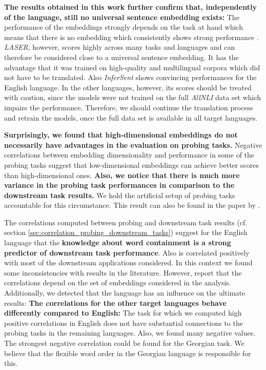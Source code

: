 \textbf{The results obtained in this work further confirm that, independently of the language, still no universal sentence embedding exists:} The performance of the embeddings strongly depends on the task at hand which means that there is no embedding which consistently shows strong performance \citep{Perone.2018}. \textit{LASER}, however, scores highly across many tasks and languages and can therefore be considered close to a universal sentence embedding. It has the advantage that it was trained on high-quality and multilingual corpora which did not have to be translated. Also \textit{InferSent} shows convincing performances for the English language. In the other languages, however, its scores should be treated with caution, since the models were not trained on the full \textit{AllNLI} data set which impairs the performance. Therefore, we should continue the translation process and retrain the models, once the full data set is available in all target languages.

\textbf{Surprisingly, we found that high-dimensional embeddings do not necessarily have advantages in the evaluation on probing tasks.} Negative correlations between embedding dimensionality and performance in some of the probing tasks suggest that low-dimensional embeddings can achieve better scores than high-dimensional ones. \textbf{Also, we notice that there is much more variance in the probing task performances in comparison to the downstream task results.} We hold the artificial setup of probing tasks accountable for this circumstance. This result can also be found in the paper by \citep{Perone.2018}.

The correlations computed between probing and downstream task results (cf. section \vref{sec:correlation_probing_downstream_tasks}) suggest for the English language that the \textbf{knowledge about word containment is a strong predictor of downstream task performance}. Also  is correlated positively with most of the downstream applications considered. In this context we found some inconsistencies with results in the literature. However, \citep{Eger.2019} report that the correlations depend on the set of embeddings considered in the analysis. Additionally, we detected that the language has an influence on the ultimate results: \textbf{The correlations for the other target languages behave differently compared to English:} The  task for which we computed high positive correlations in English does not have substantial connections to the probing tasks in the remaining languages. Also, we found many negative values. The strongest negative correlation could be found for the Georgian  task. We believe that the flexible word order in the Georgian language is responsible for this.

